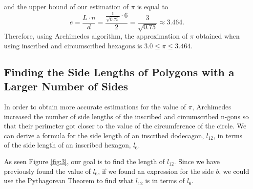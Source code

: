 \documentclass{article}
\begin{document}
\noindent and the upper bound of our estimation of $\pi$ is equal to
\begin{equation*}
    e = \frac{L \cdot n}{d} = \frac{\frac{1}{\sqrt{0.75}} \cdot 6}{2} = \frac{3}{\sqrt{0.75}} \approx 3.464.
\end{equation*}
Therefore, using Archimedes algorithm, the approximation of $\pi$ obtained when using inscribed and circumscribed hexagons is $3.0 \leq \pi \leq 3.464$.

\subsection{Finding the Side Lengths of Polygons with a Larger Number of Sides}
In order to obtain more accurate estimations for the value of $\pi$, Archimedes increased the number of side lengths of the inscribed and circumscribed n-gons so that their perimeter got closer to the value of the circumference of the circle. We can derive a formula for the side length of an inscribed dodecagon, $l_{12}$, in terms of the side length of an inscribed hexagon, $l_{6}$.
\par As seen Figure \ref{fig:3}, our goal is to find the length of $l_{12}$. Since we have previously found the value of $l_6$, if we found an expression for the side $b$, we could use the Pythagorean Theorem to find what $l_{12}$ is in terms of $l_6$.
\end{document}
